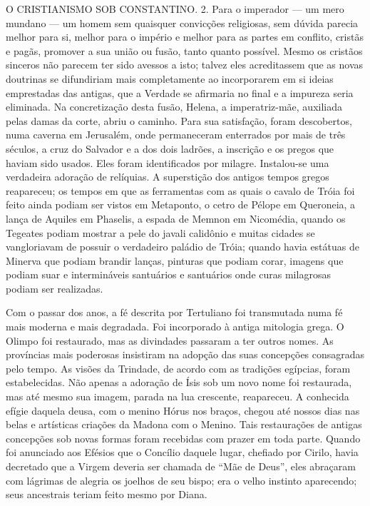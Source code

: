\documentclass[11pt,a5paper,twoside,openany]{book}
\begin{document}
O CRISTIANISMO SOB CONSTANTINO. 2. Para o imperador — um mero mundano — um homem sem quaisquer convicções religiosas, sem dúvida parecia melhor para si, melhor para o império e melhor para as partes em conflito, cristãs e pagãs, promover a sua união ou fusão, tanto quanto possível. Mesmo os cristãos sinceros não parecem ter sido avessos a isto; talvez eles acreditassem que as novas doutrinas se difundiriam mais completamente ao incorporarem em si ideias emprestadas das antigas, que a Verdade se afirmaria no final e a impureza seria eliminada. Na concretização desta fusão, Helena, a imperatriz-mãe, auxiliada pelas damas da corte, abriu o caminho. Para sua satisfação, foram descobertos, numa caverna em Jerusalém, onde permaneceram enterrados por mais de três séculos, a cruz do Salvador e a dos dois ladrões, a inscrição e os pregos que haviam sido usados. Eles foram identificados por milagre. Instalou-se uma verdadeira adoração de relíquias. A superstição dos antigos tempos gregos reapareceu; os tempos em que as ferramentas com as quais o cavalo de Tróia foi feito ainda podiam ser vistos em Metaponto, o cetro de Pélope em Queroneia, a lança de Aquiles em Phaselis, a espada de Memnon em Nicomédia, quando os Tegeates podiam mostrar a pele do javali calidônio e muitas cidades se vangloriavam de possuir o verdadeiro paládio de Tróia; quando havia estátuas de Minerva que podiam brandir lanças, pinturas que podiam corar, imagens que podiam suar e intermináveis ​​santuários e santuários onde curas milagrosas podiam ser realizadas.

Com o passar dos anos, a fé descrita por Tertuliano foi transmutada numa fé mais moderna e mais degradada. Foi incorporado à antiga mitologia grega. O Olimpo foi restaurado, mas as divindades passaram a ter outros nomes. As províncias mais poderosas insistiram na adopção das suas concepções consagradas pelo tempo. As visões da Trindade, de acordo com as tradições egípcias, foram estabelecidas. Não apenas a adoração de Ísis sob um novo nome foi restaurada, mas até mesmo sua imagem, parada na lua crescente, reapareceu. A conhecida efígie daquela deusa, com o menino Hórus nos braços, chegou até nossos dias nas belas e artísticas criações da Madona com o Menino. Tais restaurações de antigas concepções sob novas formas foram recebidas com prazer em toda parte. Quando foi anunciado aos Efésios que o Concílio daquele lugar, chefiado por Cirilo, havia decretado que a Virgem deveria ser chamada de “Mãe de Deus”, eles abraçaram com lágrimas de alegria os joelhos de seu bispo; era o velho instinto aparecendo; seus ancestrais teriam feito mesmo por Diana.
\end{document}

